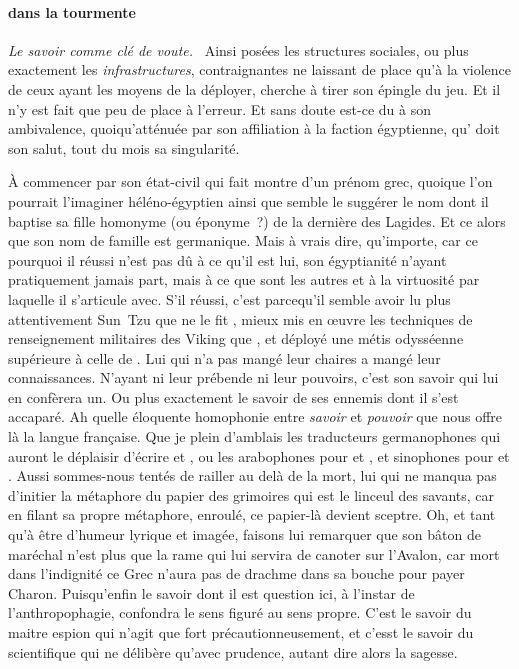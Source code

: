 
\paragraph{\elena{} dans la tourmente}
{\em\normalsize Le savoir comme clé de voute.}~
Ainsi posées les structures sociales, ou plus exactement les \emph{infrastructures}, contraignantes ne laissant de place qu’à la violence de ceux ayant les moyens de la déployer, \elena{} cherche à tirer son épingle du jeu.
Et il n’y est fait que peu de place à l’erreur. Et sans doute est-ce du à son ambivalence, quoiqu’atténuée par son affiliation à la faction égyptienne, qu’\elena{}  doit son salut, tout du mois sa singularité.

À commencer par son état-civil qui fait montre d’un prénom grec, quoique l’on pourrait l’imaginer héléno-égyptien ainsi que semble le suggérer le nom dont il baptise sa fille homonyme (ou éponyme ?) de la dernière des Lagides. Et ce alors que son nom de famille est germanique. Mais à vrais dire, qu’importe, car ce pourquoi il réussi n’est pas dû à ce qu’il est lui, son égyptianité n’ayant pratiquement jamais part, mais à ce que sont les autres et à la virtuosité par laquelle il s’articule avec. S’il réussi, c’est parcequ’il semble avoir lu plus attentivement Sun~Tzu que ne le fit \reine, mieux mis en œuvre les techniques de renseignement militaires des Viking que \princesse, et déployé une métis odysséenne supérieure à celle de \general. Lui qui n’a pas mangé leur chaires a mangé leur connaissances. N’ayant ni leur prébende ni leur pouvoirs, c’est son savoir qui lui en confèrera un. Ou plus exactement le savoir de ses ennemis dont il s’est accaparé. Ah quelle éloquente homophonie entre \emph{savoir} et \emph{pouvoir} que nous offre là la langue française. Que je plein d’amblais les traducteurs germanophones qui auront le déplaisir d’écrire  et , ou les arabophones pour  et , et sinophones pour  et .
Aussi sommes-nous tentés de railler \general{} au delà de la mort, lui qui ne manqua pas d’initier la métaphore du papier des grimoires qui est le linceul des savants, car en filant sa propre métaphore, enroulé, ce papier-là devient sceptre. Oh, et tant qu’à être d’humeur lyrique et imagée, faisons lui remarquer que son bâton de maréchal n’est plus que la rame qui lui servira de canoter sur l’Avalon, car mort dans l’indignité ce Grec n’aura pas de drachme dans sa bouche pour payer Charon. %
Puisqu’enfin le {savoir} dont il est question ici, à l’instar de l’anthropophagie, confondra le sens figuré au sens propre. C’est le savoir du maitre espion qui n’agit que fort précautionneusement, et c’esst le savoir du scientifique qui ne délibère qu’avec prudence, autant dire alors la sagesse.


